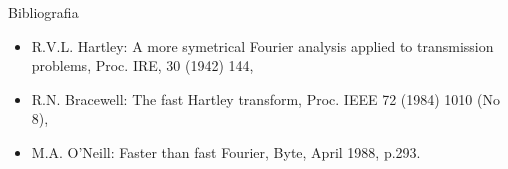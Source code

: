\begin{comment}
\begin{frame}{Własności HT}
	\begin{block}{16.30}
		\centering
		\begin{enumerate}[1$^\circ$]
			\item $F_r(j) = H(j) + H(n-j)$ \\ $F_i(j) = H(j) + H(n-j)$ \\
			\item power spectrum: $P_s(j) = [H^2(j) + H^2(n-j)] \cdot \frac{1}{2}$ \\
			\item $f_1(t) \ast f_2(t) = \int\limits_{-\infty}^{\infty} f_1(\tau) \cdot f_2(t - \tau) d\tau$ \hfill - splot \\
			$f_1(t) \ast f_2(t) = F_1(f) \cdot F_2(f)$ \\
			$f_1(t) \ast f_2(t) = H_1(f) \cdot H_{2e}(f) + H_1(-f) \cdot H_{2o}(f)$
		\end{enumerate}
	\end{block}
	dla oznaczeń:
	\begin{itemize}
		\item r - real, i - imaginary \\
		\item o - odd, e - even \\
		\item F, f - Fourier, H - Hartley
	\end{itemize}
\end{frame}
\begin{frame}{Szybka Transformacja Hartley'a}
	\begin{block}{Fourier}
	\[
		F_j = F_{1j} + F_{2j} \cdot e^{-i\frac{2\pi j}{n'}} , n' = \frac{n}{2}
	\]
	\end{block}
	\begin{block}{Hartley}
	\[
		H_j = H_{1j} + H_{2j} \cdot \cos \bigg( \frac{2\pi j}{n'} \bigg) + H_2(n'-1) \cdot \sin \bigg( \frac{2\pi j}{n'} \bigg)
	\]
	\end{block}
\end{frame}
\end{comment}
\begin{frame}{Bibliografia}
	\begin{itemize}
		\item R.V.L. Hartley: A more symetrical Fourier analysis applied to transmission problems, Proc. IRE, 30 (1942) 144, \\
		\item R.N. Bracewell: The fast Hartley transform, Proc. IEEE 72 (1984) 1010 (No 8), \\
		\item M.A. O'Neill: Faster than fast Fourier, Byte, April 1988, p.293. 
	\end{itemize}
\end{frame}
